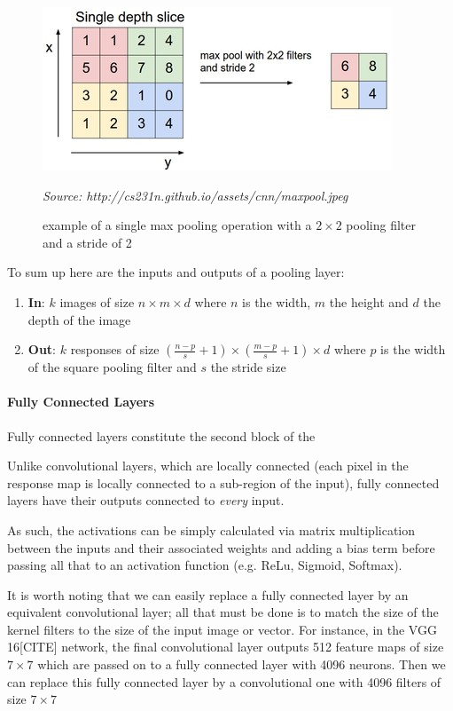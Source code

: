 \documentclass[12pt,twoside]{article}
\newcommand{\source}[1]{\vspace{-3pt} \caption*{ \footnotesize{\textit{Source: {#1}}}} }
\begin{document}
\begin{figure}[ht]
  \centering
  \includegraphics[scale=0.7]{./figures/maxpool.jpeg}
  \caption{example of a single max pooling operation with a $2 \times 2$ pooling
  filter and a stride of 2}
  \source{http://cs231n.github.io/assets/cnn/maxpool.jpeg}
  \label{fig:maxpool}
\end{figure}

To sum up here are the inputs and outputs of a pooling layer:

\begin{enumerate}
  \item \textbf{In}: $k$ images of size $n \times m \times d$ where $n$ is the
    width, $m$ the height and $d$ the depth of the image
  \item \textbf{Out}: $k$ responses of size $\left( \frac{n-p}{s} + 1  \right)\times
    \left( \frac{m-p}{s}+1  \right)\times d$ where $p$ is the width of the
    square pooling filter and $s$ the stride size
\end{enumerate}

\paragraph{Fully Connected Layers}

Fully connected layers constitute the second block of the 

Unlike convolutional layers, which are locally connected (each pixel in the
response map is locally connected to a sub-region of the input), fully
connected layers have their outputs connected to \textit{every} input.

As such, the activations can be simply calculated via matrix multiplication
between the inputs and their associated weights and adding a bias term before
passing all that to an activation function (e.g. ReLu, Sigmoid, Softmax).

It is worth noting that we can easily replace a fully connected layer by an
equivalent convolutional layer; all that must be done is to match the size of
the kernel filters to the size of the input image or vector. For instance, in
the VGG 16[CITE] network, the final convolutional layer outputs 512 feature maps of
size $7 \times 7$ which are passed on to a fully connected layer with 4096
neurons. Then we can replace this fully connected layer by a convolutional one
with 4096 filters of size $7 \times 7$
\end{document}
